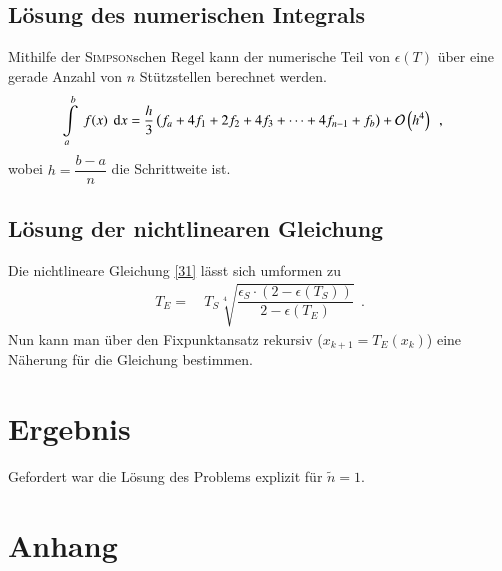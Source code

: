 \documentclass[12pt,a4paper,titlepage]{scrreprt}
\begin{document}
	\subsection{Lösung des numerischen Integrals}
	Mithilfe der \textsc{Simpson}schen Regel kann der numerische Teil von $\epsilon(T)$ über eine gerade Anzahl von $n$ Stützstellen berechnet werden.
	\begin{align}
		\int\limits_a^b~f(x)~\dif x =&~\dfrac{h}{3}\left(f_a+4f_1+2f_2+4f_3+\dots+4f_{n-1}+f_b\right)+\mathcal{O}\left(h^4\right)~~,
	\end{align}
	wobei $h=\dfrac{b-a}{n}$ die Schrittweite ist.
	
	
	\subsection{Lösung der nichtlinearen Gleichung}
	Die nichtlineare Gleichung \eqref{31} lässt sich umformen zu
	\begin{align}
		T_E=&~T_S\sqrt[4]{\dfrac{\epsilon_S\cdot\left(2-\epsilon\left(T_S\right)\right)}{2-\epsilon\left(T_E\right)}}~~.
	\end{align}
	Nun kann man über den Fixpunktansatz rekursiv ($x_{k+1}=T_E(x_k)$)  eine Näherung für die Gleichung bestimmen.
	
	
	\section{Ergebnis}
	Gefordert war die Lösung des Problems explizit für $\tilde{n}=1$.

	
	\section{Anhang}

	
\end{document}
